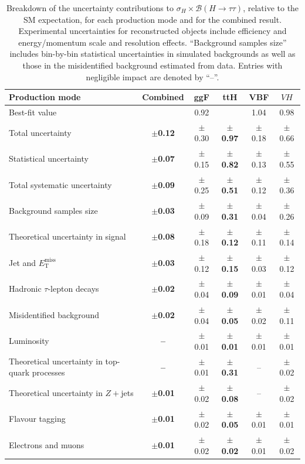 \begin{table}
  \centering
  \footnotesize
  \renewcommand{\arraystretch}{1.2}
  \caption{Breakdown of the uncertainty contributions to \(\sigma_H \times \mathcal{B}(H\!\to\!\tau\tau)\), relative to the SM expectation, for each production mode and for the combined result. Experimental uncertainties for reconstructed objects include efficiency and energy/momentum scale and resolution effects. ``Background samples size'' includes bin-by-bin statistical uncertainties in simulated backgrounds as well as those in the misidentified background estimated from data. Entries with negligible impact are denoted by “--”.}
  \label{tab:1_4_fit_uncert_summary}
  \begin{tabular}{
      l
      >{\bfseries\boldmath}c  %
      c
      >{\bfseries\boldmath}c  %
      c
      c
    }
    \toprule
    \textbf{Production mode} & \textbf{Combined} & \textbf{ggF} & \textbf{ttH} & \textbf{VBF} & \textbf{\(VH\)} \\
    \midrule
    Best-fit value                  & 0.99 & 0.92 & 0.77 & 1.04 & 0.98 \\
    Total uncertainty               & $\pm$0.12 & $\pm$0.30 & $\pm$0.97 & $\pm$0.18 & $\pm$0.66 \\
    \addlinespace[0.3em]
    Statistical uncertainty         & $\pm$0.07 & $\pm$0.15 & $\pm$0.82 & $\pm$0.13 & $\pm$0.55 \\
    Total systematic uncertainty    & $\pm$0.09 & $\pm$0.25 & $\pm$0.51 & $\pm$0.12 & $\pm$0.36 \\
    \midrule
    Background samples size         & $\pm$0.03 & $\pm$0.09 & $\pm$0.31 & $\pm$0.04 & $\pm$0.26 \\
    Theoretical uncertainty in signal     & $\pm$0.08 & $\pm$0.18 & $\pm$0.12 & $\pm$0.11 & $\pm$0.14 \\
    Jet and \(E_{\mathrm{T}}^{\mathrm{miss}}\)      & $\pm$0.03 & $\pm$0.12 & $\pm$0.15 & $\pm$0.03 & $\pm$0.12 \\
    Hadronic \(\tau\)-lepton decays        & $\pm$0.02 & $\pm$0.04 & $\pm$0.09 & $\pm$0.01 & $\pm$0.04 \\
    Misidentified background        & $\pm$0.02 & $\pm$0.04 & $\pm$0.05 & $\pm$0.02 & $\pm$0.11 \\
    Luminosity                      & -- & $\pm$0.01 & $\pm$0.01 & $\pm$0.01 & $\pm$0.01 \\
    Theoretical uncertainty in top-quark processes & -- & $\pm$0.01 & $\pm$0.31 & -- & $\pm$0.02 \\
    Theoretical uncertainty in \(Z\!+\)jets & $\pm$0.01 & $\pm$0.02 & $\pm$0.08 & -- & $\pm$0.02 \\
    Flavour tagging                 & $\pm$0.01 & $\pm$0.02 & $\pm$0.05 & $\pm$0.01 & $\pm$0.01 \\
    Electrons and muons             & $\pm$0.01 & $\pm$0.02 & $\pm$0.02 & $\pm$0.01 & $\pm$0.02 \\
    \bottomrule
  \end{tabular}
\end{table}

